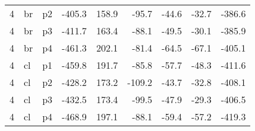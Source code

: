 \documentclass[a4paper]{article}
\begin{document}
\begin{table}[ht]
\begin{tabular}{rllrrrrrr}
   4 & br & p2 & -405.3 & 158.9 & -95.7 & -44.6 & -32.7 & -386.6 \\ 
   4 & br & p3 & -411.7 & 163.4 & -88.1 & -49.5 & -30.1 & -385.9 \\ 
   4 & br & p4 & -461.3 & 202.1 & -81.4 & -64.5 & -67.1 & -405.1 \\ 
   4 & cl & p1 & -459.8 & 191.7 & -85.8 & -57.7 & -48.3 & -411.6 \\ 
   4 & cl & p2 & -428.2 & 173.2 & -109.2 & -43.7 & -32.8 & -408.1 \\ 
   4 & cl & p3 & -432.5 & 173.4 & -99.5 & -47.9 & -29.3 & -406.5 \\ 
   4 & cl & p4 & -468.9 & 197.1 & -88.1 & -59.4 & -57.2 & -419.3 \\ 
   \hline
\end{tabular}
\end{table}
\end{document}
